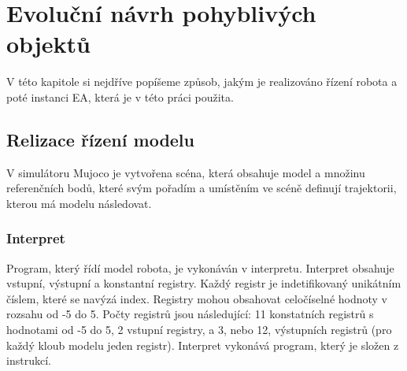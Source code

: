 
\chapter{Evoluční návrh pohyblivých objektů}





V této kapitole si nejdříve popíšeme způsob, jakým je realizováno řízení robota a poté instanci EA, která je v této práci použita.


\section{Relizace řízení modelu}
V simulátoru Mujoco je vytvořena scéna, která obsahuje model a množinu referenčních bodů, které svým pořadím a umístěním ve scéně definují trajektorii, kterou má modelu následovat.

\subsection{Interpret}
Program, který řídí model robota, je vykonáván v interpretu.
Interpret obsahuje vstupní, výstupní a konstantní registry.
Každý registr je indetifikovaný unikátním číslem, které se navýzá index.
Registry mohou obsahovat celočíselné hodnoty v rozsahu od -5 do 5.
Počty registrů jsou následující: 11 konstatních registrů s hodnotami od -5 do 5, 2 vstupní registry, a 3, nebo 12, výstupních registrů (pro každý kloub modelu jeden registr).
Interpret vykonává program, který je složen z instrukcí.

